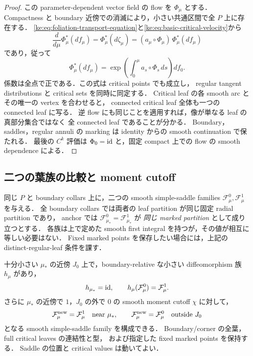 \begin{proof}
この parameter-dependent vector field の flow を $\Phi_\mu$ とする．
Compactness と boundary 近傍での消滅により，小さい共通区間で全 $P$ 上に存在する．
\eqref{ke:eq:foliation-transport-equation}と\eqref{ke:eq:basic-critical-velocity}から
\[
 \frac{d}{d\mu}\Phi_\mu^*(df_\mu)
   =\Phi_\mu^*(d\zeta_\mu)
   =(a_\mu\circ\Phi_\mu)\,\Phi_\mu^*(df_\mu)
\]
であり，従って
\begin{equation}\label{ke:eq:foliation-covector-transport}
 \Phi_\mu^*(df_\mu)
 =\exp\!\left(\int_0^\mu a_s\circ\Phi_s\,ds\right)df_0.
\end{equation}
係数は全点で正である．この式は critical points でも成立し，
regular tangent distributions と critical sets を同時に同定する．
Critical leaf の各 smooth arc とその唯一の vertex を合わせると，
connected critical leaf 全体も一つの connected leaf に写る．
逆 flow にも同じことを適用すれば，像が単なる leaf の真部分集合ではなく
全 connected leaf であることが分かる．
Boundary，saddles，regular annuli の marking は identity からの smooth continuation で保たれる．
最後の $C^k$ 評価は $\Phi_0=\operatorname{id}$ と，固定 compact 上での flow の smooth dependence による．
\end{proof}

\subsection{二つの葉族の比較と moment cutoff}

\begin{theorem}
\label{ke:saddle-moving-relative-interpolation}
同じ $P$ と boundary collars 上に，二つの smooth simple-saddle families
$\mathcal F^0_\mu,\mathcal F^1_\mu$ を与える．
全 boundary collars では両者の leaf partition が同じ固定 radial partition であり，
anchor では $\mathcal F^0_{\mu_*}=\mathcal F^1_{\mu_*}$ が
\emph{同じ marked partition} として成り立つとする．
各族は上で定めた smooth first integral を持つが，その値が相互に等しい必要はない．
Fixed marked points を保存したい場合には，上記の distinct-regular-leaf 条件を課す．

十分小さい $\mu_*$ の近傍 $J_0$ 上で，boundary-relative な小さい diffeomorphism 族
$h_\mu$ があり，
\[
 h_{\mu_*}=\operatorname{id},\qquad
 h_\mu(\mathcal F^0_\mu)=\mathcal F^1_\mu.
\]
さらに $\mu_*$ の近傍で $1$，$J_0$ の外で $0$ の smooth moment cutoff $\chi$ に対して，
\[
 \mathcal F^{\rm new}_\mu=\mathcal F^1_\mu
 \quad\text{near }\mu_*,\qquad
 \mathcal F^{\rm new}_\mu=\mathcal F^0_\mu
 \quad\text{outside }J_0
\]
となる smooth simple-saddle family を構成できる．
Boundary/corner の全葉，full critical leaves の連結性と型，
および指定した fixed marked points を保持する．
Saddle の位置と critical values は動いてよい．
\end{theorem}

